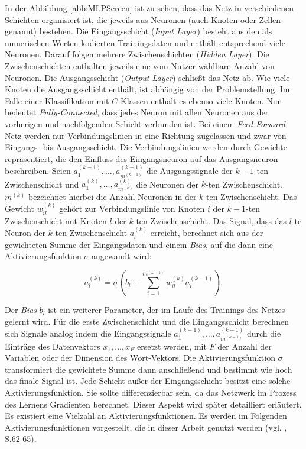 \documentclass[a4paper,11pt]{article}
\begin{document}
In der Abbildung \ref{abb:MLPScreen} ist zu sehen, dass das Netz in verschiedenen Schichten organisiert ist, die jeweils aus Neuronen (auch Knoten oder Zellen genannt) bestehen. Die Eingangsschicht (\textit{Input Layer}) besteht aus den als numerischen Werten kodierten Trainingsdaten und enthält entsprechend viele Neuronen. Darauf folgen mehrere Zwischenschichten (\textit{Hidden Layer}). Die Zwischenschichten enthalten jeweils eine vom Nutzer wählbare Anzahl von Neuronen. Die Ausgangsschicht (\textit{Output Layer}) schließt das Netz ab. Wie viele Knoten die Ausgangsschicht enthält, ist abhängig von der Problemstellung. Im Falle einer Klassifikation mit $C$ Klassen enthält es ebenso viele Knoten. Nun bedeutet \textit{Fully-Connected}, dass jedes Neuron mit allen Neuronen aus der vorherigen und nachfolgenden Schicht verbunden ist. Bei einem \textit{Feed-Forward} Netz werden nur Verbindungslinien in eine Richtung zugelassen und zwar von Eingangs- bis Ausgangsschicht. Die Verbindungslinien werden durch Gewichte repräsentiert, die den Einfluss des Eingangsneuron auf das Ausgangsneuron beschreiben. Seien $a_1^{(k-1)},..., a_{m^{(k-1)}}^{(k-1)}$ die Ausgangssignale der $k-1$-ten Zwischenschicht und $a_{1}^{(k)},..., a_{m^{(k)}}^{(k)}$ die Neuronen der $k$-ten Zwischenschicht. $m^{(k)}$ bezeichnet hierbei die Anzahl Neuronen in der $k$-ten Zwischenschicht. 
Das Gewicht $w_{il}^{(k)}$ gehört zur Verbindungslinie von Knoten $i$ der $k-1$-ten Zwischenschicht mit Knoten $l$ der $k$-ten Zwischenschicht. Das Signal, dass das $l$-te Neuron der $k$-ten Zwischenschicht $a_{l}^{(k)}$ erreicht, berechnet sich aus der gewichteten Summe der Eingangsdaten und einem \textit{Bias}, auf die dann eine Aktivierungsfunktion $\sigma$ angewandt wird:

\[ a_{l}^{(k)} = \sigma (b_l + \sum_{i=1}^{m^{(k-1)}} w_{il}^{(k)} a_{i}^{(k-1)}).\]

Der \textit{Bias} $b_l$ ist ein weiterer Parameter, der im Laufe des Trainings des Netzes gelernt wird.
Für die erste Zwischenschicht und die Eingangsschicht berechnen sich Signale analog indem die Eingangssignale $a_{1}^{(k-1)},..., a_{m^{(k-1)}}^{(k-1)}$ durch die Einträge des Datenvektors $x_1, ..., x_F$ ersetzt werden, mit $F$ der Anzahl der Variablen oder der Dimension des Wort-Vektors. Die Aktivierungsfunktion $\sigma$ transformiert die gewichtete Summe dann anschließend und bestimmt wie hoch das finale Signal ist. Jede Schicht außer der Eingangsschicht besitzt eine solche Aktivierungsfunktion. Sie sollte differenzierbar sein, da das Netzwerk im Prozess des Lernens Gradienten berechnet. Dieser Aspekt wird später detailliert erläutert. Es existiert eine Vielzahl an Aktivierungsfunktionen. Es werden im Folgenden Aktivierungsfunktionen vorgestellt, die in dieser Arbeit genutzt werden (vgl. \cite{deepEssentials}, S.62-65). 
\end{document}
